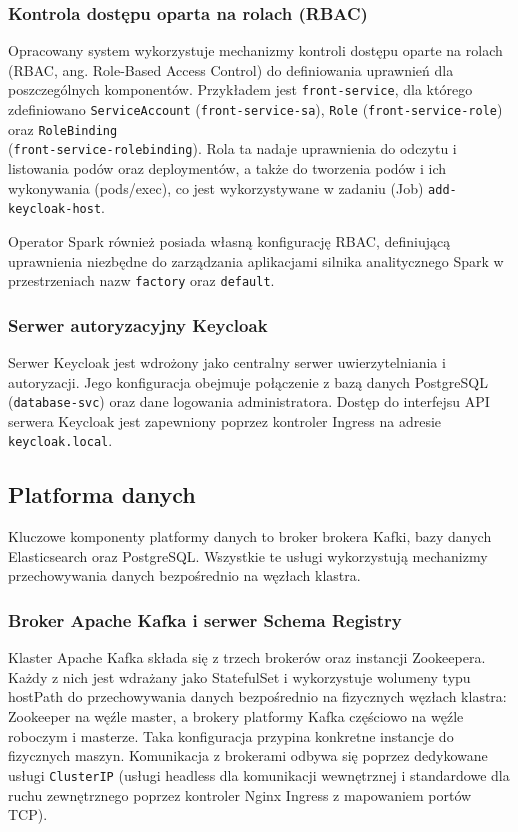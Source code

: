 \subsubsection{Kontrola dostępu oparta na rolach (RBAC)}
\label{subsubsec:RBAC}
Opracowany system wykorzystuje mechanizmy kontroli dostępu oparte na rolach (RBAC, ang. Role-Based Access Control) do definiowania uprawnień dla poszczególnych komponentów. Przykładem jest \texttt{front-service}, dla którego zdefiniowano \texttt{ServiceAccount} (\texttt{front-service-sa}), \texttt{Role} (\texttt{front-service-role}) oraz \texttt{RoleBinding} \\ (\texttt{front-service-rolebinding}). Rola ta nadaje uprawnienia do odczytu i listowania podów oraz deploymentów, a także do tworzenia podów i ich wykonywania (pods/exec), co jest wykorzystywane w zadaniu (Job) \texttt{add-keycloak-host}.

Operator Spark również posiada własną konfigurację RBAC, definiującą uprawnienia niezbędne do zarządzania aplikacjami silnika analitycznego Spark w przestrzeniach nazw \texttt{factory} oraz \texttt{default}.

\subsubsection{Serwer autoryzacyjny Keycloak}
Serwer Keycloak jest wdrożony jako centralny serwer uwierzytelniania i autoryzacji. Jego konfiguracja obejmuje połączenie z bazą danych PostgreSQL (\texttt{database-svc}) oraz dane logowania administratora. Dostęp do interfejsu API serwera Keycloak jest zapewniony poprzez kontroler Ingress na adresie \texttt{keycloak.local}.

\subsection{Platforma danych}

Kluczowe komponenty platformy danych to broker brokera Kafki, bazy danych Elasticsearch oraz PostgreSQL. Wszystkie te usługi wykorzystują mechanizmy przechowywania danych bezpośrednio na węzłach klastra.

\subsubsection{Broker Apache Kafka i serwer Schema Registry}
Klaster Apache Kafka składa się z trzech brokerów oraz instancji Zookeepera. Każdy z nich jest wdrażany jako StatefulSet i wykorzystuje wolumeny typu hostPath do przechowywania danych bezpośrednio na fizycznych węzłach klastra: Zookeeper na węźle master, a brokery platformy Kafka częściowo na węźle roboczym i masterze. Taka konfiguracja przypina konkretne instancje do fizycznych maszyn. Komunikacja z brokerami odbywa się poprzez dedykowane usługi \texttt{ClusterIP} (usługi headless dla komunikacji wewnętrznej i standardowe dla ruchu zewnętrznego poprzez kontroler Nginx Ingress z mapowaniem portów TCP).

